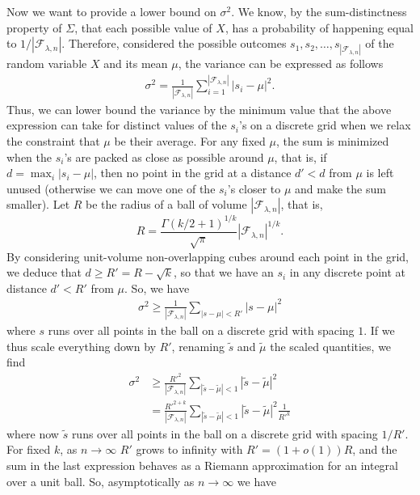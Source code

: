 \documentclass[a4paper]{amsart}
\theoremstyle{plain}
\begin{document}
Now we want to provide a lower bound on $\sigma^2$. We know, by the sum-distinctness property of $\Sigma$, that each possible value of $X$, has a probability of happening equal to $1/|\mathcal{F}_{\lambda,n}|$. Therefore, considered the possible outcomes $s_1,s_2,\dots, s_{|\mathcal{F}_{\lambda,n}|}$ of the random variable $X$ and its mean $\mu$, the variance can be expressed as follows
\begin{align*}
\sigma^2 = \frac{1}{|\mathcal{F}_{\lambda,n}|} \sum_{i=1}^{|\mathcal{F}_{\lambda,n}|} |s_i - \mu|^2.
\end{align*}
Thus, we can lower bound the variance by the minimum value that the above expression can take for distinct values of the $s_i$'s on a discrete grid when we relax the constraint that $\mu$ be their average. For any fixed $\mu$, the sum is minimized when the $s_i$'s are packed as close as possible around $\mu$, that is, if $d=\max_{i}|s_i-\mu|$, then no point in the grid at a distance $d'<d$ from $\mu$ is left unused (otherwise we can move one of the $s_i$'s closer to $\mu$ and make the sum smaller). Let $R$ be the radius of a ball of volume $|\mathcal{F}_{\lambda,n}|$, that is,
\begin{equation}\label{eq:sphereRadius}
R = \frac{\Gamma(k/2 + 1)^{1/k}}{\sqrt{\pi}} |\mathcal{F}_{\lambda,n}|^{1/k}.
\end{equation}
By considering unit-volume non-overlapping cubes around each point in the grid, we deduce that $d\geq R'=R-\sqrt{k}$, so that we have an $s_i$ in any discrete point at distance $d'<R'$ from $\mu$. So, we have
\begin{align*}
\sigma^2 \geq \frac{1}{|\mathcal{F}_{\lambda,n}|} \sum_{|s-\mu|< R'}|s - \mu|^2
\end{align*}
where $s$ runs over all points in the ball on a discrete grid with spacing $1$. If we thus scale everything down by $R'$, renaming $\tilde{s}$ and $\tilde{\mu}$ the scaled quantities, we find
\begin{align*}
\sigma^2  & \geq  \frac{R'^2}{|\mathcal{F}_{\lambda,n}|} \sum_{|\tilde{s}-\tilde{\mu}|< 1}|\tilde{s} - \tilde{\mu}|^2\\
& =   \frac{R'^{2+k}}{|\mathcal{F}_{\lambda,n}|} \sum_{|\tilde{s}-\tilde{\mu}|< 1}|\tilde{s} - \tilde{\mu}|^2\frac{1}{R'^k}
\end{align*}
 where now $\tilde{s}$ runs over all points in the ball on a discrete grid with spacing $1/R'$. For fixed $k$, as $n\to\infty$  $R'$ grows to infinity with $R'=(1+o(1))R$, and the sum in the last expression behaves as a Riemann approximation for an integral over a unit ball. So, asymptotically as $n\to\infty$ we have 
\end{document}

